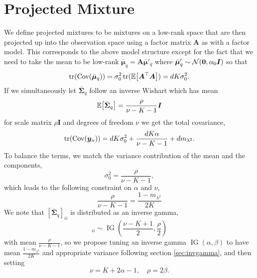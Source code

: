 \documentclass{article}
\newcommand{\mix}{\bm{A}}
\newcommand{\obs}{y}
\newcommand{\obsvec}{\bm{\obs}}
\newcommand{\mean}{\mu}
\newcommand{\meanvec}{\bm{\mean}}
\newcommand{\scale}{\sigma}
\newcommand{\scalesq}{\scale^2}
\newcommand{\compmeanvec}{\bar{\meanvec}}
\newcommand{\compcov}{\bar{\bm{\Sigma}}}
\newcommand{\noisescalesq}{\lambda^2}
\begin{document}
\section{Projected Mixture}
We define projected mixtures to be mixtures on a low-rank space that are then projected up into the observation space using a factor matrix $\mix$ as with a factor model. This corresponds to the above model structure except for the fact that we need to take the mean to be low-rank $\compmeanvec_q=\mix {\compmeanvec}'_q$ where $\compmeanvec'_q\sim\gaussrnd(\bm{0},\alpha_0\bm{I})$ so that
\begin{equation}
\trace(\Cov{\compmeanvec_q})=\scalesq_0\trace(\E{\mix\T\mix})=dK\scalesq_0.
\end{equation}
If we simultaneously let $\compcov_q$ follow an inverse Wishart which has mean 
\begin{equation}
\E{\compcov_q}=\frac{\rho}{\nu - K - 1}\bm{I}
\end{equation}
for scale matrix $\rho \bm{I}$ and degrees of freedom $\nu$ we get the total covariance,
\begin{equation}
\trace(\Cov{\obsvec_n})=dK\scalesq_0+\frac{dK\alpha}{\nu-K-1}+dm_{\noisescalesq}.
\end{equation}  
To balance the terms, we match the variance contribution of the mean and the components, 
\begin{equation}
\scalesq_0=\frac{\rho}{\nu-K-1},
\end{equation}
which leads to the following constraint on $\alpha$ and $\nu$,
\begin{equation}
\frac{\rho}{\nu-K-1}=\frac{1-m_{\noisescalesq}}{2K}
\end{equation}
We note that $[\compcov_q]_{ii}$ is distributed as an inverse gamma,
\begin{equation}
[\compcov_q]_{ii}\sim \operatorname{IG}\left(\frac{\nu-K+1}{2},\frac{\rho}{2}\right)
\end{equation}
with mean $\frac{\rho}{\nu-K-1}$, so we propose tuning an inverse gamma $\operatorname{IG}(\alpha,\beta)$ to have mean $\frac{1-m_{\noisescalesq}}{2K}$ and appropriate variance following section \ref{sec:invgamma}, and then setting
\begin{equation}
\nu=K+2\alpha-1,\quad \rho=2\beta.
\end{equation}
\end{document}
